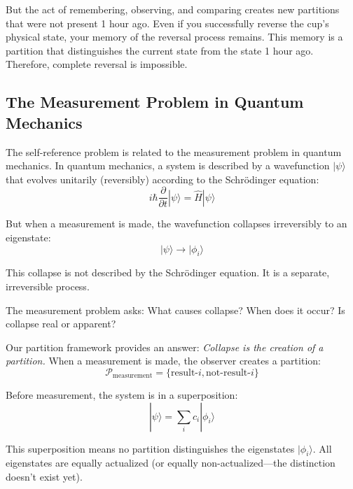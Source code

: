 \documentclass[twocolumn,10pt]{article}
\theoremstyle{definition}
\theoremstyle{remark}
\begin{document}
But the act of remembering, observing, and comparing creates new partitions that were not present 1 hour ago. Even if you successfully reverse the cup's physical state, your memory of the reversal process remains. This memory is a partition that distinguishes the current state from the state 1 hour ago. Therefore, complete reversal is impossible.

\subsection{The Measurement Problem in Quantum Mechanics}

The self-reference problem is related to the measurement problem in quantum mechanics\cite{vonneumann1932}. In quantum mechanics, a system is described by a wavefunction $|\psi\rangle$ that evolves unitarily (reversibly) according to the Schrödinger equation:
\begin{equation}
i\hbar \frac{\partial}{\partial t}|\psi\rangle = \hat{H}|\psi\rangle
\end{equation}

But when a measurement is made, the wavefunction collapses irreversibly to an eigenstate:
\begin{equation}
|\psi\rangle \to |\phi_i\rangle
\end{equation}

This collapse is not described by the Schrödinger equation. It is a separate, irreversible process.

\vspace{0.2cm}
\noindent The measurement problem asks: What causes collapse? When does it occur? Is collapse real or apparent?

\vspace{0.2cm}
\noindent Our partition framework provides an answer: \textit{Collapse is the creation of a partition.} When a measurement is made, the observer creates a partition:
\begin{equation}
\mathcal{P}_{\text{measurement}} = \{\text{result-}i, \text{not-result-}i\}
\end{equation}

Before measurement, the system is in a superposition:
\begin{equation}
|\psi\rangle = \sum_i c_i |\phi_i\rangle
\end{equation}

This superposition means no partition distinguishes the eigenstates $|\phi_i\rangle$. All eigenstates are equally actualized (or equally non-actualized—the distinction doesn't exist yet).
\end{document}
